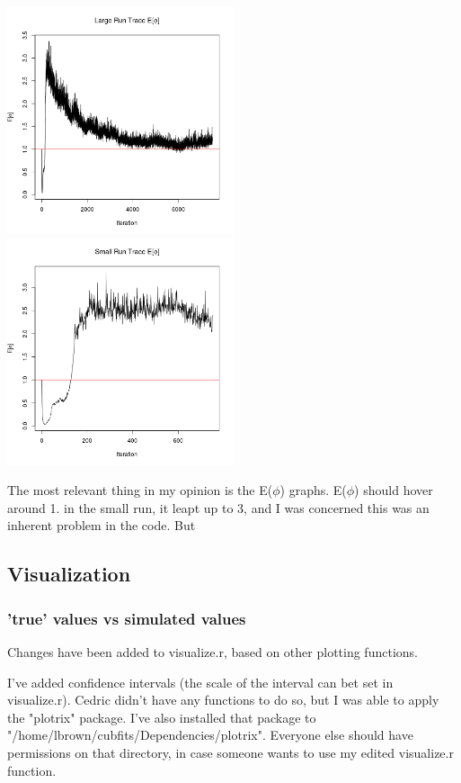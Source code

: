 \includegraphics[width=0.5\textwidth]{data/ephi_largerun.png}
\includegraphics[width=0.5\textwidth]{data/ephi_smallrun.png}

The most relevant thing in my opinion is the E($\phi$) graphs. E($\phi$) should hover around 1. in the small run, it leapt up to 3, and I was concerned this was an inherent problem in the code. But 


\subsection{Visualization}

\subsubsection{'true' values vs simulated values}

Changes have been added to visualize.r, based on other plotting functions.

I've added confidence intervals (the scale of the interval can bet set in visualize.r). Cedric didn't have any functions to do so, but I was able to apply the "plotrix" package. I've also installed that package to "/home/lbrown/cubfits/Dependencies/plotrix". Everyone else should have permissions on that directory, in case someone wants to use my edited visualize.r function.




